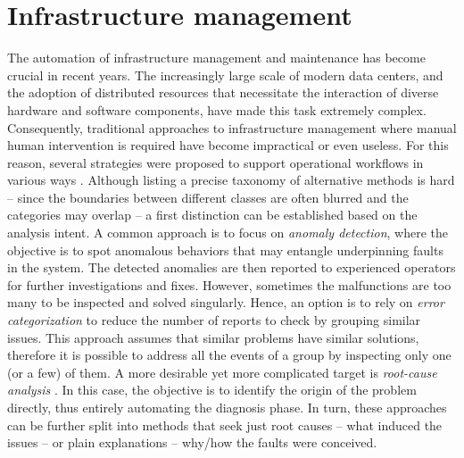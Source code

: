 \chapter{Infrastructure management} \label{ch:opint}
The automation of infrastructure management and maintenance has become crucial in recent years. 
The increasingly large scale of modern data centers, and the adoption of distributed resources that necessitate the interaction of diverse hardware and software components, have made this task extremely complex. Consequently, traditional approaches to infrastructure management where manual human intervention is required have become impractical or even useless. 
For this reason, several strategies were proposed to support operational workflows in various ways \cite{opint2020, opint2022, decker2020powerquality, diotalevi2019elk}.
Although listing a precise taxonomy of alternative methods is hard -- since the boundaries between different classes are often blurred and the categories may overlap -- a first distinction can be established based on the analysis intent.
A common approach is to focus on \textit{anomaly detection}, where the objective is to spot anomalous behaviors that may entangle underpinning faults in the system. The detected anomalies are then reported to experienced operators for further investigations and fixes.
However, sometimes the malfunctions are too many to be inspected and solved singularly. Hence, an option is to rely on \textit{error categorization} to reduce the number of reports to check by grouping similar issues. This approach assumes that similar problems have similar solutions, therefore it is possible to address all the events of a group by inspecting only one (or a few) of them.
A more desirable yet more complicated target is \textit{root-cause analysis} \cite{sole2017survey}. In this case, the objective is to identify the origin of the problem directly, thus entirely automating the diagnosis phase.
In turn, these approaches can be further split into methods that seek just root causes -- what induced the issues -- or plain explanations -- why/how the faults were conceived.

